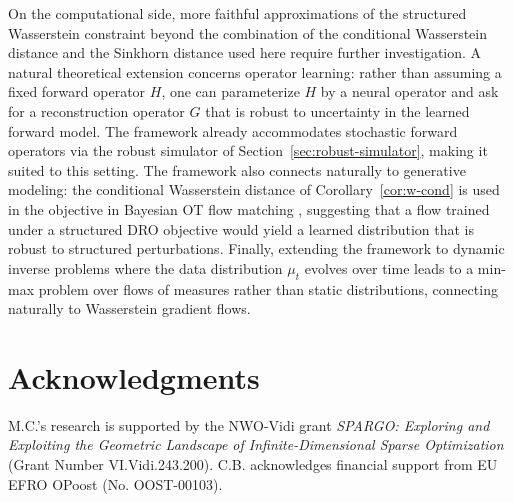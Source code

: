 \documentclass{article}
\theoremstyle{definition}
\theoremstyle{remarksty}
\begin{document}
On the computational side, more faithful approximations of the structured Wasserstein constraint beyond the combination of the conditional Wasserstein distance and the Sinkhorn distance used here require further investigation. A natural theoretical extension concerns operator learning: rather than assuming a fixed forward operator $H$, one can parameterize $H$ by a neural operator and ask for a reconstruction operator $G$ that is robust to uncertainty in the learned forward model. The framework already accommodates stochastic forward operators via the robust simulator of Section~\ref{sec:robust-simulator}, making it suited to this setting. The framework also connects naturally to generative modeling: the conditional Wasserstein distance of Corollary~\ref{cor:w-cond} is used in the objective in Bayesian OT flow matching \cite{chemseddine_conditional_2025}, suggesting that a flow trained under a structured DRO objective would yield a learned distribution that is robust to structured perturbations. Finally, extending the framework to dynamic inverse problems where the data distribution $\mu_t$ evolves over time leads to a min-max problem over flows of measures rather than static distributions, connecting naturally to Wasserstein gradient flows.

\section*{Acknowledgments}
M.C.'s research is supported by the NWO-Vidi grant \emph{SPARGO: Exploring and Exploiting the Geometric Landscape of Infinite-Dimensional Sparse Optimization} (Grant Number VI.Vidi.243.200). C.B. acknowledges financial support from EU EFRO OPoost (No. OOST-00103).




\appendix
\end{document}
